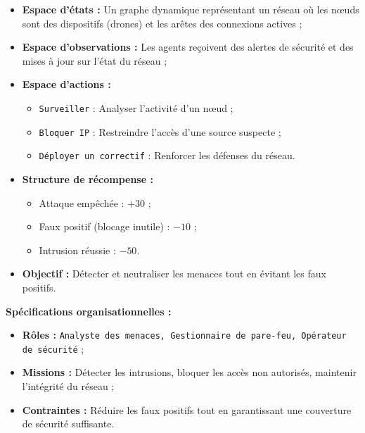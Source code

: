 \documentclass[pdflatex,sn-mathphys-num]{sn-jnl}%
\theoremstyle{thmstyleone}%
\theoremstyle{thmstyletwo}%
\theoremstyle{thmstylethree}%
\begin{document}
\begin{itemize}
    \item \textbf{Espace d'états :} Un graphe dynamique représentant un réseau où les nœuds sont des dispositifs (drones) et les arêtes des connexions actives ;
    \item \textbf{Espace d'observations :} Les agents reçoivent des alertes de sécurité et des mises à jour sur l'état du réseau ;
    \item \textbf{Espace d'actions :}
          \begin{itemize}
              \item \texttt{Surveiller} : Analyser l'activité d'un nœud ;
              \item \texttt{Bloquer IP} : Restreindre l'accès d'une source suspecte ;
              \item \texttt{Déployer un correctif} : Renforcer les défenses du réseau.
          \end{itemize}
    \item \textbf{Structure de récompense :}
          \begin{itemize}
              \item Attaque empêchée : $+30$ ;
              \item Faux positif (blocage inutile) : $-10$ ;
              \item Intrusion réussie : $-50$.
          \end{itemize}
    \item \textbf{Objectif :} Détecter et neutraliser les menaces tout en évitant les faux positifs.
\end{itemize}

\textbf{Spécifications organisationnelles :}
\begin{itemize}
    \item \textbf{Rôles :} \texttt{Analyste des menaces, Gestionnaire de pare-feu, Opérateur de sécurité} ;
    \item \textbf{Missions :} Détecter les intrusions, bloquer les accès non autorisés, maintenir l'intégrité du réseau ;
    \item \textbf{Contraintes :} Réduire les faux positifs tout en garantissant une couverture de sécurité suffisante.
\end{itemize}
\end{document}
